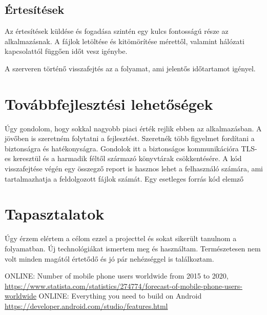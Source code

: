 \documentclass{thesis-ekf}
\theoremstyle{definition}
\theoremstyle{remark}
\begin{document}
\section{Értesítések}

Az értesítések küldése és fogadása szintén egy kulcs fontosságú része az alkalmazásnak.
A fájlok letöltése és kitömörítése mérettől, valamint hálózati kapcsolattól függően időt vesz igénybe.

A szerveren történő visszafejtés az a folyamat, ami jelentős időtartamot igényel.

\chapter{Továbbfejlesztési lehetőségek}\label{lehetosegek}

Úgy gondolom, hogy sokkal nagyobb piaci érték rejlik ebben az alkalmazásban.
A jövőben is szeretném folytatni a fejlesztést.
Szeretnék több figyelmet fordítani a biztonságra és hatékonyságra.
Gondolok itt a biztonságos kommunikációra TLS-es keresztül és a harmadik féltől származó könyvtárak csökkentésére.
A kód visszafejtése végén egy összegző report is hasznos lehet a felhasználó számára, ami tartalmazhatja a feldolgozott fájlok számát.
Egy esetleges forrás kód elemző 

\chapter{Tapasztalatok}\label{tapasztalatok}

Úgy érzem elértem a célom ezzel a projecttel és sokat sikerült tanulnom a folyamatban.
Új technológiákat ismertem meg és használtam.
Természetesen nem volt minden magától értetődő és jó pár nehézséggel is találkoztam.


\begin{thebibliography}{1}
 \textsc{ONLINE}: Number of mobile phone users worldwide from 2015 to 2020, \url{https://www.statista.com/statistics/274774/forecast-of-mobile-phone-users-worldwide}
 \textsc{ONLINE}: Everything you need to build on Android \url{https://developer.android.com/studio/features.html}
\end{thebibliography}
\end{document}
